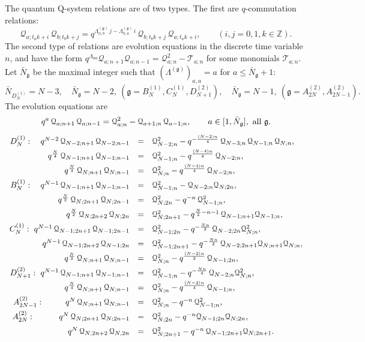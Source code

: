 \documentclass[12pt]{amsart}
\newcommand{\g}{{\mathfrak{g}}}
\newcommand{\Z}{{\mathbb Z}}
\newcommand{\Q}{{\mathcal Q}}
\newcommand{\lL}{{\Lambda}}
\numberwithin{equation}{section}
\begin{document}
The quantum Q-system relations are of two types. The first are $q$-commutation relations:
\begin{equation}\label{qsys1}
\Q_{a;t_a k+i}\,\Q_{b;t_b k+j}= q^{\Lambda^{(\g)}_{a,b}\, j-\Lambda^{(\g)}_{b,a}\,i}\,\Q_{b;t_b k+j}\, \Q_{a;t_a k+i}, \qquad (i,j=0,1,k\in \Z).
\end{equation}
%
The second type of relations are  evolution equations in the discrete time variable $n$, and
have the form $q^{\Lambda_{aa}} \Q_{a;n+1} \Q_{a;n-1} = \Q_{a;n}^2 - \mathcal T_{a;n}$ for some monomials $\mathcal T_{a;n}$. 
%
Let $\bar{N}_\g$ be the maximal integer such that $(\lL^{(\g)})_{a,a}=a$ for $a\leq\bar{N}_\g+1$:
$$\bar N_{D_N^{(1)}}=N-3,\quad \bar N_\g=N-2,\ (\g=B_N^{(1)},C_N^{(1)},D_{N+1}^{(2)}),\quad \bar N_{\g}=
 N-1,\ (\g=A_{2N}^{(2)}, A_{2N-1}^{(2)}).$$ 
The evolution equations are
\begin{equation}\label{qsys2}
q^{a}\, \Q_{a;n+1}\,\Q_{a;n-1}= \Q_{a;n}^2 - \Q_{a+1;n}\,\Q_{a-1;n}, \qquad a\in[1,\bar{N}_\g], \hbox{ all $\g$}.
\end{equation}
%
%
\begin{equation}\label{qsys3}\renewcommand{\arraystretch}{1.5}
\begin{array}{rcl}
D_N^{(1)}:\ \ \ q^{N-2}\, \Q_{N-2;n+1}\, \Q_{N-2;n-1}&=& \Q_{N-2;n}^2 -q^{-\frac{(N-2)n}{4}}\, \Q_{N-3;n}\,\Q_{N-1;n}\,\Q_{N;n} ,\\
q^{\frac{N}{4}}\,\Q_{N-1;n+1}\, \Q_{N-1;n-1}&=& \Q_{N-1;n}^2-q^{\frac{(N-4)n}{4}}\,\Q_{N-2;n} ,\\
q^{\frac{N}{4}}\,\Q_{N;n+1}\, \Q_{N;n-1}&=& \Q_{N;n}^2-q^{\frac{(N-4)n}{4}}\,\Q_{N-2;n} ,\\
B_N^{(1)}:\ \ \ q^{N-1}\,\Q_{N-1;n+1}\, \Q_{N-1;n-1}&=& \Q_{N-1;n}^2-\Q_{N-2;n}\Q_{N;2n}, \\
q^{\frac{N}{2}} \,\Q_{N;2n+1}\, \Q_{N;2n-1}&=& \Q_{N;2n}^2-q^{-n}\,\Q_{N-1;n}^2 ,\\
q^{\frac{N}{2}} \,\Q_{N;2n+2}\, \Q_{N;2n}&=& \Q_{N;2n+1}^2-q^{\frac{N}{2}-n-1}\,\Q_{N-1;n+1}\Q_{N-1;n}, \\
C_N^{(1)}:\ q^{N-1}\,\Q_{N-1;2n+1}\, \Q_{N-1;2n-1}&=& \Q_{N-1;2n}^2-q^{-\frac{Nn}{2}}\,\Q_{N-2;2n}\Q_{N;n}^2 ,\\
q^{N-1}\,\Q_{N-1;2n+2}\, \Q_{N-1;2n}&=& \Q_{N-1;2n+1}^2-q^{-\frac{Nn}{2}}\,\Q_{N-2;2n+1}\Q_{N;n+1}\Q_{N;n} ,\\
q^{\frac{N}{2}}\,\Q_{N;n+1}\, \Q_{N;n-1}&=& \Q_{N;n}^2-q^{\frac{(N-2)n}{2}}\, \Q_{N-1;2n}, \\
%
%
D_{N+1}^{(2)}:\ q^{N-1}\,\Q_{N-1;n+1}\, \Q_{N-1;n-1}&=& \Q_{N-1;n}^2-q^{-\frac{Nn}{4}}\, \Q_{N-2;n}\Q_{N;n}^2 ,\\
q^{\frac{N}{4}}\,\Q_{N;n+1}\, \Q_{N;n-1}&=& \Q_{N;n}^2-q^{\frac{(N-2)n}{4}}\,\Q_{N-1;n}, \\
A_{2N-1}^{(2)}:\ \ \ \ \ \ \ \ q^{N}\,\Q_{N;n+1}\, \Q_{N;n-1}&=& \Q_{N;n}^2-q^{-n}\, \Q_{N-1;n}^2,\\
A_{2N}^{(2)}:\ \ \ \ \ \ \ \ \ q^N\,\Q_{N;2n+1}\, \Q_{N;2n-1}&=& \Q_{N;2n}^2-q^{-n}  \Q_{N-1;2n} \Q_{N;2n},\\
q^N\,\Q_{N,2n+2}\, \Q_{N,2n}&=& \Q_{N;2n+1}^2-q^{-n}\, \Q_{N-1;2n+1} \Q_{N;2n+1}.
\end{array}\end{equation}
%
\end{document}

